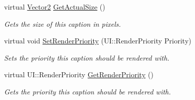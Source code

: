 \begin{DoxyCompactItemize}
virtual \hyperlink{classphys_1_1Vector2}{Vector2} \hyperlink{classphys_1_1UI_1_1Caption_aa80a4328d76458a6e869c485bea48b98}{GetActualSize} ()
\begin{DoxyCompactList}\small\item\em Gets the size of this caption in pixels. \item\end{DoxyCompactList}\item 
virtual void \hyperlink{classphys_1_1UI_1_1Caption_a27e71736c847ff6e50be7191e3db5225}{SetRenderPriority} (UI::RenderPriority Priority)
\begin{DoxyCompactList}\small\item\em Sets the priority this caption should be rendered with. \item\end{DoxyCompactList}\item 
virtual UI::RenderPriority \hyperlink{classphys_1_1UI_1_1Caption_ada0bf1e830f8f672adbc3263e7095896}{GetRenderPriority} ()
\begin{DoxyCompactList}\small\item\em Gets the priority this caption should be rendered with. \item\end{DoxyCompactList}\end{DoxyCompactItemize}
